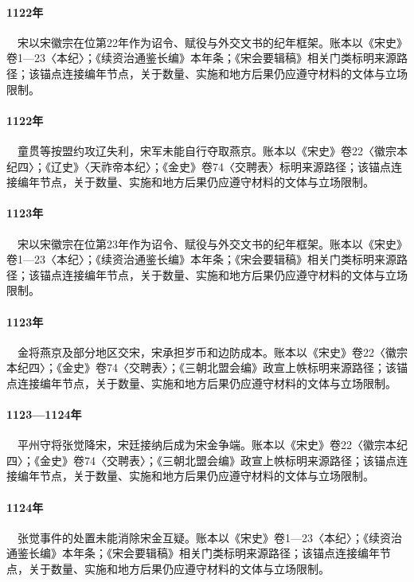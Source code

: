 \paragraph{1122年}　宋以宋徽宗在位第22年作为诏令、赋役与外交文书的纪年框架。账本以《宋史》卷1—23〈本纪〉；《续资治通鉴长编》本年条；《宋会要辑稿》相关门类标明来源路径；该锚点连接编年节点，关于数量、实施和地方后果仍应遵守材料的文体与立场限制。

\paragraph{1122年}　童贯等按盟约攻辽失利，宋军未能自行夺取燕京。账本以《宋史》卷22〈徽宗本纪四〉；《辽史》〈天祚帝本纪〉；《金史》卷74〈交聘表〉标明来源路径；该锚点连接编年节点，关于数量、实施和地方后果仍应遵守材料的文体与立场限制。

\paragraph{1123年}　宋以宋徽宗在位第23年作为诏令、赋役与外交文书的纪年框架。账本以《宋史》卷1—23〈本纪〉；《续资治通鉴长编》本年条；《宋会要辑稿》相关门类标明来源路径；该锚点连接编年节点，关于数量、实施和地方后果仍应遵守材料的文体与立场限制。

\paragraph{1123年}　金将燕京及部分地区交宋，宋承担岁币和边防成本。账本以《宋史》卷22〈徽宗本纪四〉；《金史》卷74〈交聘表〉；《三朝北盟会编》政宣上帙标明来源路径；该锚点连接编年节点，关于数量、实施和地方后果仍应遵守材料的文体与立场限制。

\paragraph{1123—1124年}　平州守将张觉降宋，宋廷接纳后成为宋金争端。账本以《宋史》卷22〈徽宗本纪四〉；《金史》卷74〈交聘表〉；《三朝北盟会编》政宣上帙标明来源路径；该锚点连接编年节点，关于数量、实施和地方后果仍应遵守材料的文体与立场限制。

\paragraph{1124年}　张觉事件的处置未能消除宋金互疑。账本以《宋史》卷1—23〈本纪〉；《续资治通鉴长编》本年条；《宋会要辑稿》相关门类标明来源路径；该锚点连接编年节点，关于数量、实施和地方后果仍应遵守材料的文体与立场限制。

